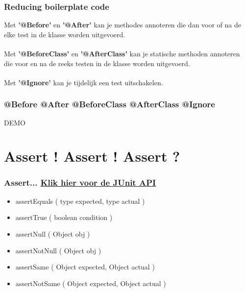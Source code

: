 \documentclass{beamer}
\begin{document}
\begin{frame}

\frametitle{Reducing boilerplate code}

{\Large Met \textbf{'@Before'} en \textbf{'@After'} kan je methodes annoteren die dan voor of na de elke test
in de klasse worden uitgevoerd.\\~\\

Met \textbf{'@BeforeClass'} en \textbf{'@AfterClass'} kan je statische methoden annoteren die voor en
na de reeks testen in de klasse worden uitgevoerd.\\~\\

Met \textbf{'@Ignore'} kan je tijdelijk een test uitschakelen.}

\end{frame}

\begin{frame}

\frametitle{\textbf{@Before @After @BeforeClass @AfterClass @Ignore}}

\begin{center}
{\huge DEMO}
\end{center}

\end{frame}


\section{Assert ! Assert ! Assert ?}


\begin{frame}

\frametitle{Assert... \href{http://junit.sourceforge.net/javadoc/}{\textbf{{\small Klik hier voor de JUnit API}}}}

\begin{itemize}

  \item {\Large assertEquals ( type expected, type actual )}
  \item {\Large assertTrue ( boolean condition )}
  \item {\Large assertNull ( Object obj )}
  \item {\Large assertNotNull ( Object obj )}
  \item {\Large assertSame ( Object expected, Object actual )}
  \item {\Large assertNotSame ( Object expected, Object actual )}
   
\end{itemize}

\end{frame}
\end{document}
